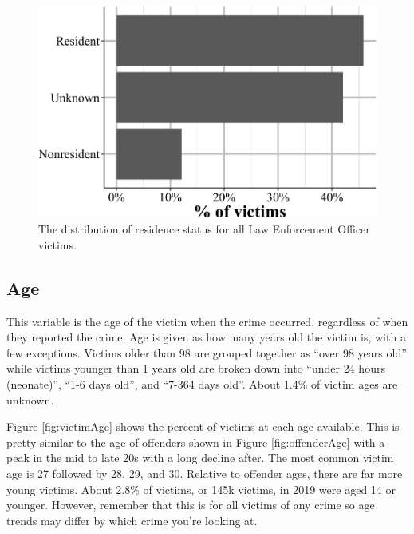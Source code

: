 \documentclass[
  12pt,
  openany]{book}
\begin{document}
\begin{figure}

{\centering \includegraphics[width=0.9\linewidth]{15_nibrs_victim_files/figure-latex/victimResidenceStatusPolice-1} 

}

\caption{The distribution of residence status for all Law Enforcement Officer victims.}\label{fig:victimResidenceStatusPolice}
\end{figure}

\subsection{Age}\label{age-3}

This variable is the age of the victim when the crime occurred, regardless of when they reported the crime. Age is given as how many years old the victim is, with a few exceptions. Victims older than 98 are grouped together as ``over 98 years old'' while victims younger than 1 years old are broken down into ``under 24 hours (neonate)'', ``1-6 days old'', and ``7-364 days old''. About 1.4\% of victim ages are unknown.

Figure \ref{fig:victimAge} shows the percent of victims at each age available. This is pretty similar to the age of offenders shown in Figure \ref{fig:offenderAge} with a peak in the mid to late 20s with a long decline after. The most common victim age is 27 followed by 28, 29, and 30. Relative to offender ages, there are far more young victims. About 2.8\% of victims, or 145k victims, in 2019 were aged 14 or younger. However, remember that this is for all victims of any crime so age trends may differ by which crime you're looking at.
\end{document}
